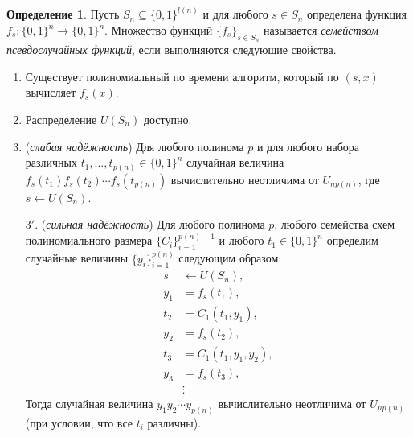\documentclass[12pt]{article}
\newcommand{\bits}{\{0,1\}}
\theoremstyle{definition}
\newtheorem{definition}{Определение}[section]
\theoremstyle{plain}
\theoremstyle{remark}
\begin{document}
\begin{definition}
Пусть $S_n \subseteq\bits^{l(n)}$ и для любого $s\in S_n$ определена функция $f_s: \bits^n\to\bits^n$.
Множество функций $\{f_s\}_{s\in S_n}$ называется \emph{семейством псевдослучайных функций}, если 
выполняются следующие свойства.
\begin{enumerate}
\item Существует полиномиальный по времени алгоритм, который по $(s, x)$ вычисляет $f_s(x)$.
\item Распределение $U(S_n)$ доступно.
\item (\emph{слабая надёжность}) Для любого полинома $p$ и для любого набора различных 
$t_1,\dotsc, t_{p(n)}\in \bits^n$ случайная величина $f_s(t_1)f_s(t_2)\dotsb f_s(t_{p(n)})$ 
вычислительно неотличима от $U_{np(n)}$, где $s\gets U(S_n)$.
\item[$3'$.] (\emph{сильная надёжность}) Для любого полинома $p$, любого семейства схем полиномиального размера
$\{C_i\}_{i=1}^{p(n) - 1}$ и любого $t_1\in\{0,1\}^n$ определим случайные величины 
$\{y_i\}_{i=1}^{p(n)}$ следующим образом:
$$
\begin{aligned}
s   &\gets U(S_n),\\
y_1 &= f_s(t_1),\\
t_2 &= C_1(t_1, y_1),\\
y_2 &= f_s(t_2),\\
t_3 &= C_1(t_1, y_1, y_2),\\
y_3 &= f_s(t_3),\\
&\vdots
\end{aligned}
$$
Тогда случайная величина $y_1y_2\dotsb y_{p(n)}$ вычислительно неотличима от $U_{np(n)}$ (при условии, что все $t_i$ различны).
\end{enumerate}
\end{definition}
\end{document}
